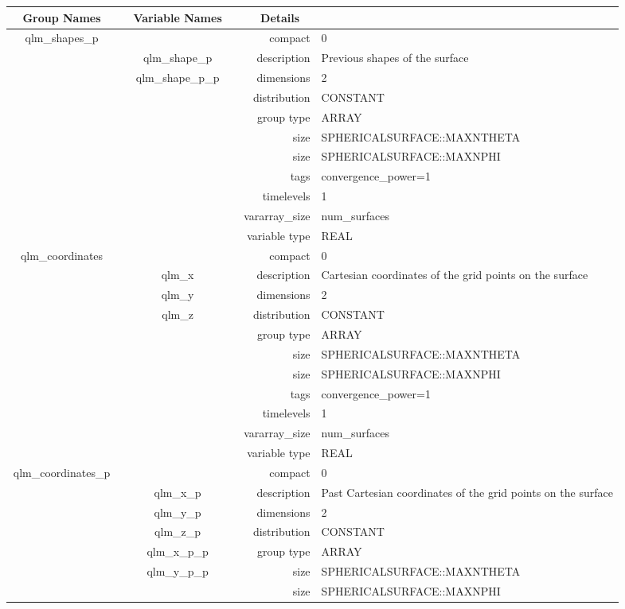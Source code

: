 \begin{tabular*}{150mm}{|c|c@{\extracolsep{\fill}}|rl|} \hline 
~ {\bf Group Names} ~ & ~ {\bf Variable Names} ~  &{\bf Details} ~ & ~ \\ 
\hline 
qlm\_shapes\_p &  & compact & 0 \\ 
 & qlm\_shape\_p & description & Previous shapes of the surface \\ 
 & qlm\_shape\_p\_p & dimensions & 2 \\ 
 &  & distribution & CONSTANT \\ 
 &  & group type & ARRAY \\ 
 &  & size & SPHERICALSURFACE::MAXNTHETA \\ 
& ~ & size & SPHERICALSURFACE::MAXNPHI \\ 
 &  & tags & convergence\_power=1 \\ 
 &  & timelevels & 1 \\ 
 &  & vararray\_size & num\_surfaces \\ 
 &  & variable type & REAL \\ 
\hline 
qlm\_coordinates &  & compact & 0 \\ 
 & qlm\_x & description & Cartesian coordinates of the grid points on the surface \\ 
 & qlm\_y & dimensions & 2 \\ 
 & qlm\_z & distribution & CONSTANT \\ 
 &  & group type & ARRAY \\ 
 &  & size & SPHERICALSURFACE::MAXNTHETA \\ 
& ~ & size & SPHERICALSURFACE::MAXNPHI \\ 
 &  & tags & convergence\_power=1 \\ 
 &  & timelevels & 1 \\ 
 &  & vararray\_size & num\_surfaces \\ 
 &  & variable type & REAL \\ 
\hline 
qlm\_coordinates\_p &  & compact & 0 \\ 
 & qlm\_x\_p & description & Past Cartesian coordinates of the grid points on the surface \\ 
 & qlm\_y\_p & dimensions & 2 \\ 
 & qlm\_z\_p & distribution & CONSTANT \\ 
 & qlm\_x\_p\_p & group type & ARRAY \\ 
 & qlm\_y\_p\_p & size & SPHERICALSURFACE::MAXNTHETA \\ 
& ~ & size & SPHERICALSURFACE::MAXNPHI \\ 

\end{tabular*}
